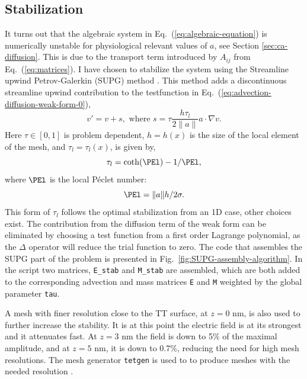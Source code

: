 \subsection{Stabilization}
\label{sec:stabilization}
It turns out that the algebraic system in Eq.~(\ref{eq:algebraic-equation}) is numerically unstable for physiological relevant values of $a$, see Section \ref{sec:ca-diffusion}. This is due to the transport term introduced by $A_{ij}$ from Eq.~(\ref{eq:matrices}). I have chosen to stabilize the system using the Streamline upwind Petrov-Galerkin (SUPG) method \cite{Broo_1982_199}. This method adds a discontinuous streamline upwind contribution to the testfunction in Eq.~(\ref{eq:advection-diffusion-weak-form-0}),
\begin{equation}
  \label{eq:stabilizing-term}
  v' = v+s, \text{ where } s = \tau\frac{h\tau_l}{2\|a\|}a\cdot\nabla v.
\end{equation}
Here $\tau\in[0,1]$ is problem dependent, $h=h(x)$ is the size of the local element of the mesh, and $\tau_l=\tau_l(x)$, is given by,
\begin{equation}
  \label{eq:local-tau}
  \tau_l=\coth(\PEl)-1/\PEl,
\end{equation}
where $\PEl$ is the local P\'eclet number:
\begin{equation}
  \label{eq:peclet}
  \PEl = \|a\|h/2\sigma.
\end{equation}
This form of $\tau_l$ follows the optimal stabilization from an 1D case\cite{Broo_1982_199}, other choices exist. The contribution from the diffusion term of the weak form can be eliminated by choosing a test function from a first order Lagrange polynomial, as the $\Delta$ operator will reduce the trial function to zero. The \pydolfin code that assembles the SUPG part of the problem is presented in Fig.~\ref{fig:SUPG-assembly-algorithm}. In the script two matrices, \texttt{E\_stab} and \texttt{M\_stab} are assembled, which are both added to the corresponding advection and mass matrices \texttt{E} and \texttt{M} weighted by the global parameter \texttt{tau}.\par

A mesh with finer resolution close to the TT surface, at $z=0$ nm, is also used to further increase the stability. It is at this point the electric field is at its strongest and it attenuates fast. At $z=3$ nm the field is down to 5\% of the maximal amplitude, and at $z=5$ nm, it is down to 0.7\%, reducing the need for high mesh resolutions. The mesh generator \texttt{tetgen} is used to to produce meshes with the needed resolution \cite{www:tetgen}.\par

